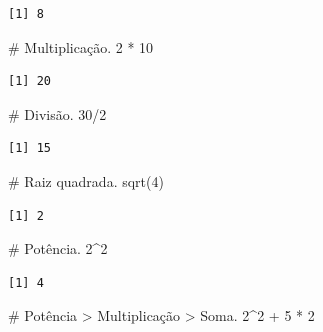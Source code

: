\documentclass[
  letterpaper,
  DIV=11,
  numbers=noendperiod]{scrreprt}
\newenvironment{Shaded}{\begin{snugshade}}{\end{snugshade}}
\newcommand{\CommentTok}[1]{\textcolor[rgb]{0.37,0.37,0.37}{#1}}
\newcommand{\DecValTok}[1]{\textcolor[rgb]{0.68,0.00,0.00}{#1}}
\newcommand{\FunctionTok}[1]{\textcolor[rgb]{0.28,0.35,0.67}{#1}}
\newcommand{\NormalTok}[1]{\textcolor[rgb]{0.00,0.23,0.31}{#1}}
\newcommand{\SpecialCharTok}[1]{\textcolor[rgb]{0.37,0.37,0.37}{#1}}
\begin{document}
\begin{verbatim}
[1] 8
\end{verbatim}

\begin{Shaded}
\begin{Highlighting}[]
\CommentTok{\# Multiplicação.}
\DecValTok{2} \SpecialCharTok{*} \DecValTok{10}
\end{Highlighting}
\end{Shaded}

\begin{verbatim}
[1] 20
\end{verbatim}

\begin{Shaded}
\begin{Highlighting}[]
\CommentTok{\# Divisão.}
\DecValTok{30}\SpecialCharTok{/}\DecValTok{2}
\end{Highlighting}
\end{Shaded}

\begin{verbatim}
[1] 15
\end{verbatim}

\begin{Shaded}
\begin{Highlighting}[]
\CommentTok{\# Raiz quadrada.}
\FunctionTok{sqrt}\NormalTok{(}\DecValTok{4}\NormalTok{)}
\end{Highlighting}
\end{Shaded}

\begin{verbatim}
[1] 2
\end{verbatim}

\begin{Shaded}
\begin{Highlighting}[]
\CommentTok{\# Potência.}
\DecValTok{2}\SpecialCharTok{\^{}}\DecValTok{2}
\end{Highlighting}
\end{Shaded}

\begin{verbatim}
[1] 4
\end{verbatim}

\begin{Shaded}
\begin{Highlighting}[]
\CommentTok{\# Potência \textgreater{} Multiplicação \textgreater{} Soma.}
\DecValTok{2}\SpecialCharTok{\^{}}\DecValTok{2} \SpecialCharTok{+} \DecValTok{5} \SpecialCharTok{*} \DecValTok{2}
\end{Highlighting}
\end{Shaded}
\end{document}
